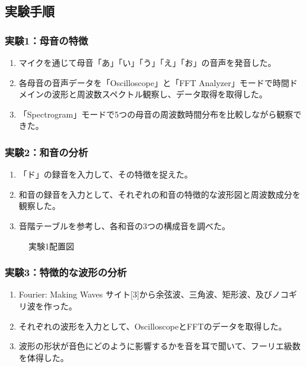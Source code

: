 \documentclass{article}
\begin{document}
\subsection{実験手順}
\subsubsection{実験1：母音の特徴}
\begin{enumerate}[label=\arabic*)]
    \item マイクを通じて母音「あ」「い」「う」「え」「お」の音声を発音した。
    \item 各母音の音声データを「Oscilloscope」と「FFT Analyzer」モードで時間ドメインの波形と周波数スペクトル観察し、データ取得を取得した。
    \item 「Spectrogram」モードで5つの母音の周波数時間分布を比較しながら観察できた。
\end{enumerate}

\subsubsection{実験2：和音の分析}
\begin{enumerate}[label=\arabic*)]
    \item 「ド」の録音を入力して、その特徴を捉えた。
    \item 和音の録音を入力として、それぞれの和音の特徴的な波形図と周波数成分を観察した。
    \item 音階テーブルを参考し、各和音の3つの構成音を調べた。
\end{enumerate}
\begin{figure}[ht] %
    \centering
    \caption{実験1配置図}
\end{figure}
\FloatBarrier

\subsubsection{実験3：特徴的な波形の分析}
\begin{enumerate}[label=\arabic*)]
    \item Fourier: Making Waves サイト[3]から余弦波、三角波、矩形波、及びノコギリ波を作った。
    \item それぞれの波形を入力として、OscilloscopeとFFTのデータを取得した。
    \item 波形の形状が音色にどのように影響するかを音を耳で聞いて、フーリエ級数を体得した。
\end{enumerate}
\end{document}
